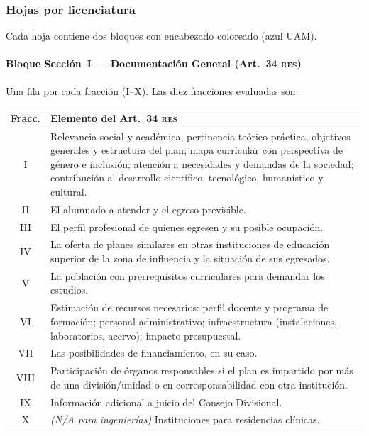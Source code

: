 \documentclass[11pt,a4paper]{article}
\newcommand{\RES}{\textsc{res}}
\begin{document}
\subsubsection{Hojas por licenciatura}

Cada hoja contiene dos bloques con encabezado coloreado (azul UAM).

\paragraph{Bloque Sección~I --- Documentación General (Art.\ 34 \RES{})}

Una fila por cada fracción (I--X). Las diez fracciones evaluadas son:

\begin{center}
\renewcommand{\arraystretch}{1.2}
\begin{longtable}{cp{10.5cm}}
\toprule
\textbf{Fracc.} & \textbf{Elemento del Art.\ 34 \RES{}} \\
\midrule
\endhead
I    & Relevancia social y académica, pertinencia teórico-práctica, objetivos generales
       y estructura del plan; mapa curricular con perspectiva de género e inclusión;
       atención a necesidades y demandas de la sociedad; contribución al desarrollo
       científico, tecnológico, humanístico y cultural. \\[4pt]
II   & El alumnado a atender y el egreso previsible. \\[4pt]
III  & El perfil profesional de quienes egresen y su posible ocupación. \\[4pt]
IV   & La oferta de planes similares en otras instituciones de educación superior de
       la zona de influencia y la situación de sus egresados. \\[4pt]
V    & La población con prerrequisitos curriculares para demandar los estudios. \\[4pt]
VI   & Estimación de recursos necesarios: perfil docente y programa de formación;
       personal administrativo; infraestructura (instalaciones, laboratorios, acervo);
       impacto presupuestal. \\[4pt]
VII  & Las posibilidades de financiamiento, en su caso. \\[4pt]
VIII & Participación de órganos responsables si el plan es impartido por más de una
       división/unidad o en corresponsabilidad con otra institución. \\[4pt]
IX   & Información adicional a juicio del Consejo Divisional. \\[4pt]
X    & \textit{(N/A para ingenierías)} Instituciones para residencias clínicas. \\
\bottomrule
\end{longtable}
\end{center}
\end{document}

